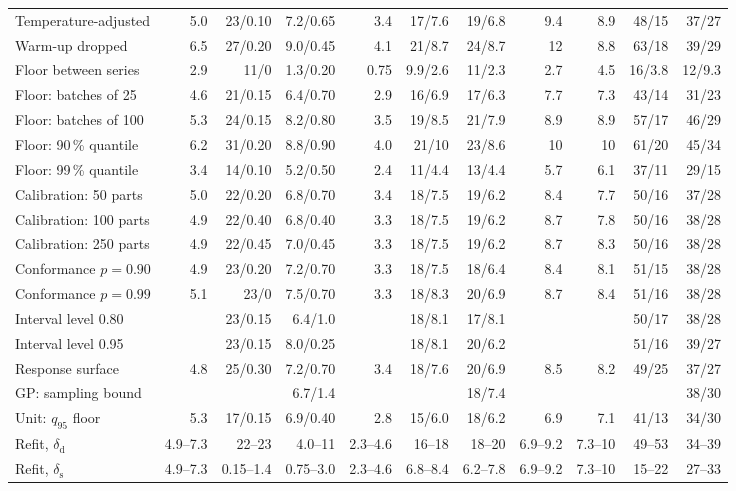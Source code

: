 \documentclass[pdflatex,sn-basic,lineno]{sn-jnl}
\begin{document}
\begin{appendices}
\begin{table}[p]
\begin{tabular}{@{}lrrrrrrrrrr@{}}
Temperature-adjusted & 5.0 & 23/0.10 & 7.2/0.65 & 3.4 & 17/7.6 & 19/6.8 & 9.4 & 8.9 & 48/15 & 37/27 \\
Warm-up dropped & 6.5 & 27/0.20 & 9.0/0.45 & 4.1 & 21/8.7 & 24/8.7 & 12 & 8.8 & 63/18 & 39/29 \\
Floor between series & 2.9 & 11/0 & 1.3/0.20 & 0.75 & 9.9/2.6 & 11/2.3 & 2.7 & 4.5 & 16/3.8 & 12/9.3 \\
Floor: batches of 25 & 4.6 & 21/0.15 & 6.4/0.70 & 2.9 & 16/6.9 & 17/6.3 & 7.7 & 7.3 & 43/14 & 31/23 \\
Floor: batches of 100 & 5.3 & 24/0.15 & 8.2/0.80 & 3.5 & 19/8.5 & 21/7.9 & 8.9 & 8.9 & 57/17 & 46/29 \\
Floor: 90\,\% quantile & 6.2 & 31/0.20 & 8.8/0.90 & 4.0 & 21/10 & 23/8.6 & 10 & 10 & 61/20 & 45/34 \\
Floor: 99\,\% quantile & 3.4 & 14/0.10 & 5.2/0.50 & 2.4 & 11/4.4 & 13/4.4 & 5.7 & 6.1 & 37/11 & 29/15 \\
Calibration: 50 parts & 5.0 & 22/0.20 & 6.8/0.70 & 3.4 & 18/7.5 & 19/6.2 & 8.4 & 7.7 & 50/16 & 37/28 \\
Calibration: 100 parts & 4.9 & 22/0.40 & 6.8/0.40 & 3.3 & 18/7.5 & 19/6.2 & 8.7 & 7.8 & 50/16 & 38/28 \\
Calibration: 250 parts & 4.9 & 22/0.45 & 7.0/0.45 & 3.3 & 18/7.5 & 19/6.2 & 8.7 & 8.3 & 50/16 & 38/28 \\
Conformance $p=0.90$ & 4.9 & 23/0.20 & 7.2/0.70 & 3.3 & 18/7.5 & 18/6.4 & 8.4 & 8.1 & 51/15 & 38/28 \\
Conformance $p=0.99$ & 5.1 & 23/0 & 7.5/0.70 & 3.3 & 18/8.3 & 20/6.9 & 8.7 & 8.4 & 51/16 & 38/28 \\
Interval level 0.80 &  & 23/0.15 & 6.4/1.0 &  & 18/8.1 & 17/8.1 &  &  & 50/17 & 38/28 \\
Interval level 0.95 &  & 23/0.15 & 8.0/0.25 &  & 18/8.1 & 20/6.2 &  &  & 51/16 & 39/27 \\
Response surface & 4.8 & 25/0.30 & 7.2/0.70 & 3.4 & 18/7.6 & 20/6.9 & 8.5 & 8.2 & 49/25 & 37/27 \\
GP: sampling bound &  &  & 6.7/1.4 &  &  & 18/7.4 &  &  &  & 38/30 \\
Unit: $q_{95}$ floor & 5.3 & 17/0.15 & 6.9/0.40 & 2.8 & 15/6.0 & 18/6.2 & 6.9 & 7.1 & 41/13 & 34/30 \\
\midrule Refit, $\delta_\mathrm{d}$ & 4.9--7.3 & 22--23 & 4.0--11 & 2.3--4.6 & 16--18 & 18--20 & 6.9--9.2 & 7.3--10 & 49--53 & 34--39 \\
Refit, $\delta_\mathrm{s}$ & 4.9--7.3 & 0.15--1.4 & 0.75--3.0 & 2.3--4.6 & 6.8--8.4 & 6.2--7.8 & 6.9--9.2 & 7.3--10 & 15--22 & 27--33 \\

\end{tabular}
\end{table}
\end{appendices}
\end{document}
